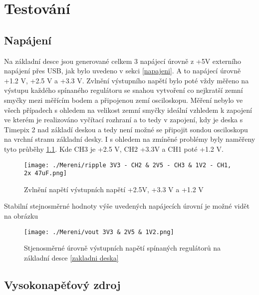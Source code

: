 \chapter{Testování}
\section{Napájení}
Na základní desce jsou generované celkem 3 napájecí úrovně z +5V externího napájení přes USB, jak bylo uvedeno v sekci \ref{napajeni}. A to napájecí úrovně +1.2 V, +2.5 V a +3.3 V. Zvlnění výstupního napětí bylo poté vždy měřeno na výstupu každého spínaného regulátoru se snahou vytvoření co nejkratší zemní smyčky mezi měřícím bodem a připojenou zemí osciloskopu. Měření nebylo ve všech případech s ohledem na velikost zemní smyčky ideální vzhledem k zapojení ve kterém je realizováno vyčítací rozhraní a to tedy v zapojení, kdy je deska s Timepix 2 nad základí deskou a tedy není možné se připojit sondou osciloskopu na vrchní stranu základní desky. I s ohledem na zmíněné problémy byly naměřeny tyto průběhy \ref{fig:napeti}. Kde CH3 je +2.5 V, CH2 +3.3V a CH1 poté +1.2 V.
\begin{figure}[h!]
	\centering
	\captionsetup{justification=centering}
	\texttt{[image: ./Mereni/ripple 3V3 - CH2 \& 2V5 - CH3 \& 1V2 - CH1, 2x 47uF.png]}
	\caption{Zvlnění napětí výstupních napětí +2.5V, +3.3 V a +1.2 V } 
	\label{fig:napeti}
\end{figure}
Stabilní stejnosměrné hodnoty výše uvedených napájecích úrovní je možné vidět na obrázku 
\begin{figure}[h!]
	\centering
	\captionsetup{justification=centering}
	\texttt{[image: ./Mereni/vout 3V3 \& 2V5 \& 1V2.png]}
	\caption{Stjenosměrné úrovně výstupních napětí spínaných regulátorů na základní desce \ref{zakladni deska}} 
	\label{fig:urovne}
\end{figure}

\section{Vysokonapěťový zdroj}
 
